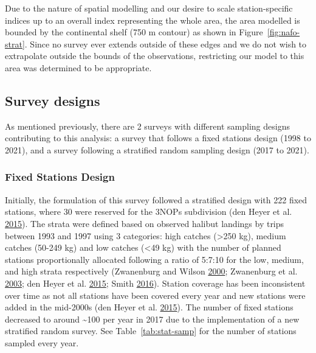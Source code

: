 \documentclass[12pt]{article}\usepackage[]{graphicx}\usepackage[]{color}
\begin{document}
Due to the nature of spatial modelling and our desire to scale station-specific indices up to an overall index representing the whole area, the area modelled is bounded by the continental shelf (750 m contour) as shown in Figure~\ref{fig:nafo-strat}. Since no survey ever extends outside of these edges and we do not wish to extrapolate outside the bounds of the observations, restricting our model to this area was determined to be appropriate.

\hypertarget{survey-designs}{%
\subsection{Survey designs}\label{survey-designs}}

As mentioned previously, there are 2 surveys with different sampling designs contributing to this analysis: a survey that follows a fixed stations design (1998 to 2021), and a survey following a stratified random sampling design (2017 to 2021).

\hypertarget{fixed-stations-design}{%
\subsubsection{Fixed Stations Design}\label{fixed-stations-design}}

Initially, the formulation of this survey followed a stratified design with 222 fixed stations, where 30 were reserved for the 3NOPs subdivision (den Heyer et al. \protect\hyperlink{ref-DenHeyer2015}{2015}). The strata were defined based on observed halibut landings by trips between 1993 and 1997 using 3 categories: high catches (\textgreater250 kg), medium catches (50-249 kg) and low catches (\textless49 kg) with the number of planned stations proportionally allocated following a ratio of 5:7:10 for the low, medium, and high strata respectively (Zwanenburg and Wilson \protect\hyperlink{ref-Zwanenburg2000}{2000}; Zwanenburg et al. \protect\hyperlink{ref-Zwanenburg2003}{2003}; den Heyer et al. \protect\hyperlink{ref-DenHeyer2015}{2015}; Smith \protect\hyperlink{ref-Smith2016a}{2016}). Station coverage has been inconsistent over time as not all stations have been covered every year and new stations were added in the mid-2000s (den Heyer et al. \protect\hyperlink{ref-DenHeyer2015}{2015}). The number of fixed stations decreased to around \textasciitilde100 per year in 2017 due to the implementation of a new stratified random survey. See Table~\ref{tab:stat-samp} for the number of stations sampled every year.
\end{document}
